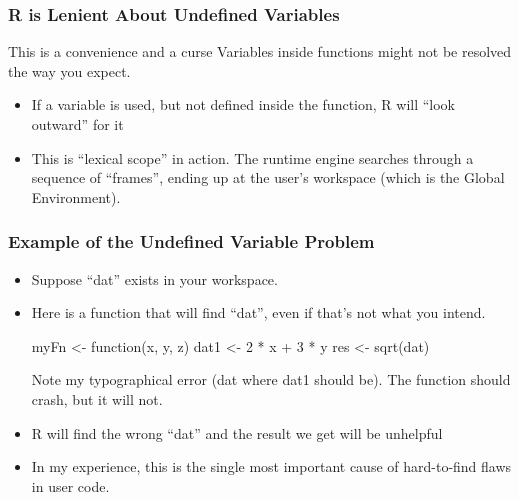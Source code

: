 \documentclass[11pt,english]{beamer}
\begin{document}
\begin{frame}[containsverbatim]
  \frametitle{R is Lenient About Undefined Variables}

  \begin{exampleblock}{This is a convenience and a curse}
    Variables inside functions might not be resolved the way you expect.

  \begin{itemize}
  \item If a variable is used, but not defined inside the function, R
    will ``look outward'' for it
  \item This is ``lexical scope'' in action. The runtime engine
    searches through a sequence of ``frames'', ending up at the user's
    workspace (which is the Global Environment).

  \end{itemize}
   \end{exampleblock}
\end{frame}


\begin{frame}[containsverbatim]
  \frametitle{Example of the Undefined Variable Problem}
  \begin{itemize}

  \item Suppose ``dat'' exists in your workspace.

  \item Here is a function that will find ``dat'', even if that's not
    what you intend.

\begin{Sinput}
myFn <- function(x, y, z){
    dat1 <- 2 * x + 3 * y
    res <- sqrt(dat)
}
\end{Sinput}

Note my typographical error (dat where dat1 should be). The function
should crash, but it will not.
   \item R will find the wrong ``dat'' and the result we get will be unhelpful

   \item In my experience, this is the single most important cause of
     hard-to-find flaws in user code.

  \end{itemize}
\end{frame}
\end{document}
